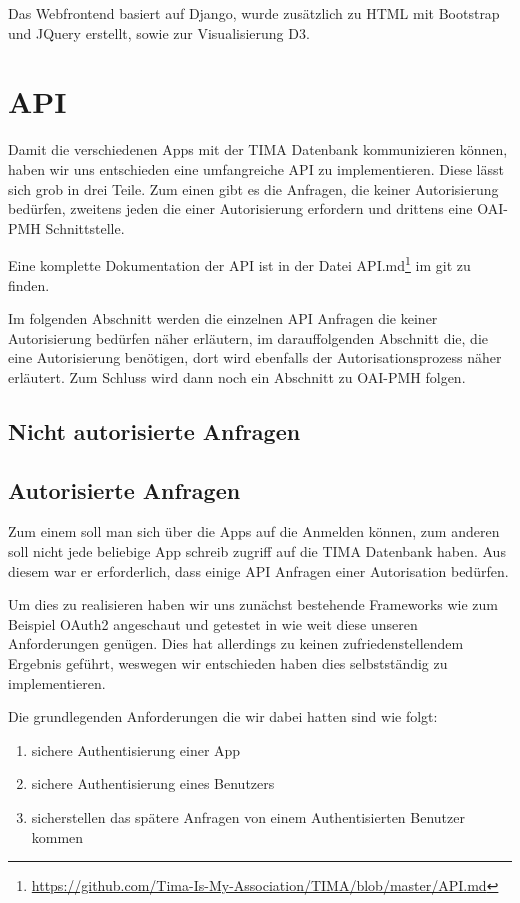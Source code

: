 Das Webfrontend basiert auf Django, wurde zusätzlich zu HTML mit Bootstrap und JQuery erstellt, sowie zur Visualisierung D3.

\section{API}
Damit die verschiedenen Apps mit der TIMA Datenbank kommunizieren können, haben wir uns entschieden eine umfangreiche API zu implementieren. Diese lässt sich grob in drei Teile. Zum einen gibt es die Anfragen, die keiner Autorisierung bedürfen, zweitens jeden die einer Autorisierung erfordern und drittens eine OAI-PMH Schnittstelle.

Eine komplette Dokumentation der API ist in der Datei API.md\footnote{\url{https://github.com/Tima-Is-My-Association/TIMA/blob/master/API.md}} im git zu finden.

Im folgenden Abschnitt werden die einzelnen API Anfragen die keiner Autorisierung bedürfen näher erläutern, im darauffolgenden Abschnitt die, die eine Autorisierung benötigen, dort wird ebenfalls der Autorisationsprozess näher erläutert. Zum Schluss wird dann noch ein Abschnitt zu OAI-PMH folgen.

\subsection{Nicht autorisierte Anfragen}
\subsection{Autorisierte Anfragen}
Zum einem soll man sich über die Apps auf die Anmelden können, zum anderen soll nicht jede beliebige App schreib zugriff auf die TIMA Datenbank haben. Aus diesem war er erforderlich, dass einige API Anfragen einer Autorisation bedürfen.

Um dies zu realisieren haben wir uns zunächst bestehende Frameworks wie zum Beispiel OAuth2 angeschaut und getestet in wie weit diese unseren Anforderungen genügen. Dies hat allerdings zu keinen zufriedenstellendem Ergebnis geführt, weswegen wir entschieden haben dies selbstständig zu implementieren.

Die grundlegenden Anforderungen die wir dabei hatten sind wie folgt:
\begin{enumerate}
	\item sichere Authentisierung einer App
	\item sichere Authentisierung eines Benutzers
	\item sicherstellen das spätere Anfragen von einem Authentisierten Benutzer kommen
\end{enumerate}

